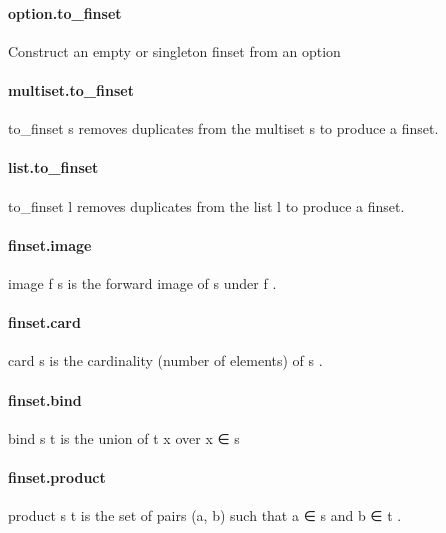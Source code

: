 \documentclass{article}
\begin{document}
\paragraph{option.to\_finset}
\par
Construct an empty or singleton finset from an 
\colorbox[RGB]{253,246,227}{{{{\color[RGB]{101, 123, 131} option }}}}\paragraph{multiset.to\_finset}
\par
\colorbox[RGB]{253,246,227}{{{{\color[RGB]{101, 123, 131} to\_finset s }}}} removes duplicates from the multiset 
\colorbox[RGB]{253,246,227}{{{{\color[RGB]{101, 123, 131} s }}}} to produce a finset.
\paragraph{list.to\_finset}
\par
\colorbox[RGB]{253,246,227}{{{{\color[RGB]{101, 123, 131} to\_finset l }}}} removes duplicates from the list 
\colorbox[RGB]{253,246,227}{{{{\color[RGB]{101, 123, 131} l }}}} to produce a finset.
\paragraph{finset.image}
\par
\colorbox[RGB]{253,246,227}{{{{\color[RGB]{101, 123, 131} image f s }}}} is the forward image of 
\colorbox[RGB]{253,246,227}{{{{\color[RGB]{101, 123, 131} s }}}} under 
\colorbox[RGB]{253,246,227}{{{{\color[RGB]{101, 123, 131} f }}}}.
\paragraph{finset.card}
\par
\colorbox[RGB]{253,246,227}{{{{\color[RGB]{101, 123, 131} card s }}}} is the cardinality (number of elements) of 
\colorbox[RGB]{253,246,227}{{{{\color[RGB]{101, 123, 131} s }}}}.
\paragraph{finset.bind}
\par
\colorbox[RGB]{253,246,227}{{{{\color[RGB]{101, 123, 131} bind s t }}}} is the union of 
\colorbox[RGB]{253,246,227}{{{{\color[RGB]{101, 123, 131} t x }}}} over 
\colorbox[RGB]{253,246,227}{{{{\color[RGB]{101, 123, 131} x ∈ s }}}}\paragraph{finset.product}
\par
\colorbox[RGB]{253,246,227}{{{{\color[RGB]{101, 123, 131} product s t }}}} is the set of pairs 
\colorbox[RGB]{253,246,227}{{{{\color[RGB]{101, 123, 131} (a, b) }}}} such that 
\colorbox[RGB]{253,246,227}{{{{\color[RGB]{101, 123, 131} a ∈ s }}}} and 
\colorbox[RGB]{253,246,227}{{{{\color[RGB]{101, 123, 131} b ∈ t }}}}.
\end{document}
